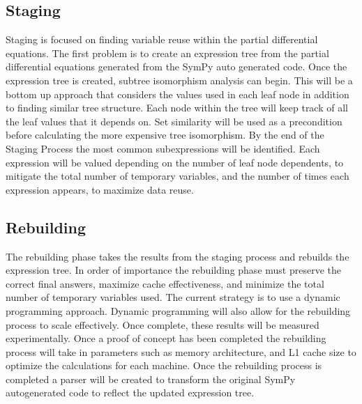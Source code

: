 \documentclass[10pt, conference]{IEEEtran} %
\begin{document}
\subsection{Staging}
	Staging is focused on finding variable reuse within the partial differential equations. The first problem is to create an expression tree from the partial differential equations generated from the SymPy auto generated code. 
	Once the expression tree is created, subtree isomorphism analysis can begin. This will be a bottom up approach that considers the values used in each leaf node in addition to finding similar tree structure. Each node within the tree will keep track of all the leaf values that it depends on. Set similarity will be used as a precondition before calculating the more expensive tree isomorphism. By the end of the Staging Process the most common subexpressions will be identified. Each expression will be valued depending on the number of leaf node dependents, to mitigate the total number of temporary variables, and the number of times each expression appears, to maximize data reuse.
	
\subsection{Rebuilding}
	The rebuilding phase takes the results from the staging process and rebuilds the expression tree. In order of importance the rebuilding phase must preserve the correct final answers, maximize cache effectiveness, and minimize the total number of temporary variables used. The current strategy is to use a dynamic programming approach. Dynamic programming will also allow for the rebuilding process to scale effectively. Once complete, these results will be measured experimentally. Once a proof of concept has been completed the rebuilding process will take in parameters such as memory architecture, and L1 cache size to optimize the calculations for each machine. Once the rebuilding process is completed a parser will be created to transform the original SymPy autogenerated code to reflect the updated expression tree.
\end{document}
